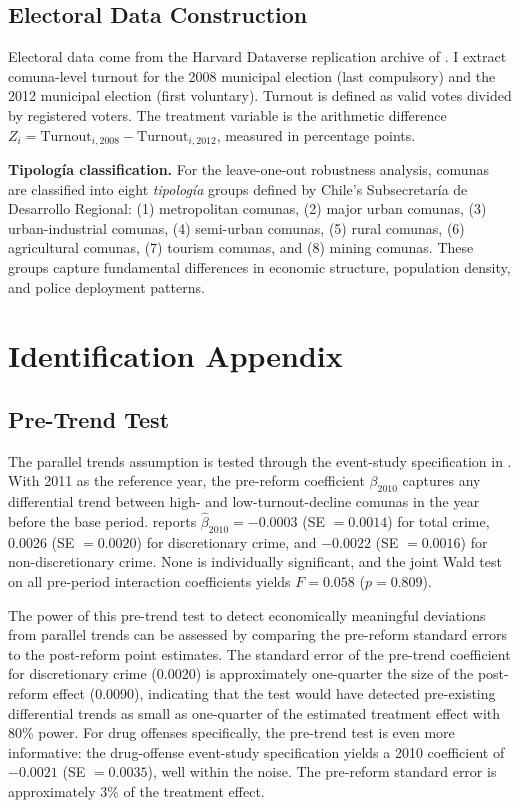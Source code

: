 \documentclass[12pt]{article}
\begin{document}
\subsection{Electoral Data Construction}

Electoral data come from the Harvard Dataverse replication archive of \citet{Cox2022}. I extract comuna-level turnout for the 2008 municipal election (last compulsory) and the 2012 municipal election (first voluntary). Turnout is defined as valid votes divided by registered voters. The treatment variable is the arithmetic difference $Z_i = \text{Turnout}_{i,2008} - \text{Turnout}_{i,2012}$, measured in percentage points.

\textbf{Tipolog\'{i}a classification.} For the leave-one-out robustness analysis, comunas are classified into eight \textit{tipolog\'{i}a} groups defined by Chile's Subsecretar\'{i}a de Desarrollo Regional: (1) metropolitan comunas, (2) major urban comunas, (3) urban-industrial comunas, (4) semi-urban comunas, (5) rural comunas, (6) agricultural comunas, (7) tourism comunas, and (8) mining comunas. These groups capture fundamental differences in economic structure, population density, and police deployment patterns.


\setcounter{table}{0}
\setcounter{figure}{0}
\section{Identification Appendix}\label{app:identification}

\subsection{Pre-Trend Test}

The parallel trends assumption is tested through the event-study specification in . With 2011 as the reference year, the pre-reform coefficient $\beta_{2010}$ captures any differential trend between high- and low-turnout-decline comunas in the year before the base period.  reports $\hat{\beta}_{2010} = -0.0003$ (SE $= 0.0014$) for total crime, $0.0026$ (SE $= 0.0020$) for discretionary crime, and $-0.0022$ (SE $= 0.0016$) for non-discretionary crime. None is individually significant, and the joint Wald test on all pre-period interaction coefficients yields $F = 0.058$ ($p = 0.809$).

The power of this pre-trend test to detect economically meaningful deviations from parallel trends can be assessed by comparing the pre-reform standard errors to the post-reform point estimates. The standard error of the pre-trend coefficient for discretionary crime (0.0020) is approximately one-quarter the size of the post-reform effect (0.0090), indicating that the test would have detected pre-existing differential trends as small as one-quarter of the estimated treatment effect with 80\% power. For drug offenses specifically, the pre-trend test is even more informative: the drug-offense event-study specification yields a 2010 coefficient of $-0.0021$ (SE $= 0.0035$), well within the noise. The pre-reform standard error is approximately 3\% of the treatment effect.
\end{document}
